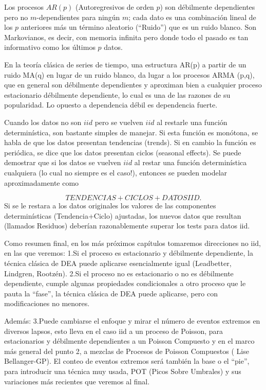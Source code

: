 \documentclass[
  12pt]{article}
\begin{document}
Los procesos \(AR(p)\) (Autoregresivos de orden \(p\)) son débilmente
dependientes pero no \(m\)-dependientes para ningún \(m\); cada dato es
una combinación lineal de los \(p\) anteriores más un término aleatorio
(``Ruido'') que es un ruido blanco. Son Markovianos, es decir, con
memoria infinita pero donde todo el pasado es tan informativo como los
últimos \(p\) datos.

En la teoría clásica de series de tiempo, una estructura AR(p) a partir
de un ruido MA(q) en lugar de un ruido blanco, da lugar a los procesos
ARMA (p,q), que en general son débilmente dependientes y aproximan bien
a cualquier proceso estacionario débilmente dependiente, lo cual es una
de las razones de su popularidad. Lo opuesto a dependencia débil es
dependencia fuerte.

Cuando los datos no son \(iid\) pero se vuelven \(iid\) al restarle una
función determinística, son bastante simples de manejar. Si esta función
es monótona, se habla de que los datos presentan tendencias (trends). Si
en cambio la función es periódica, se dice que los datos presentan
ciclos (seasonal effects). Se puede demostrar que si los datos se
vuelven \(iid\) al restar una función determinística cualquiera (lo cual
no siempre es el caso!), entonces se pueden modelar aproximadamente como

\[
TENDENCIAS+CICLOS+ DATOS IID.
\] Si se le restara a los datos originales los valores de las
componentes determinísticas (Tendencia+Ciclo) ajustadas, los nuevos
datos que resultan (llamados Residuos) deberían razonablemente superar
los tests para datos iid.

Como resumen final, en los más próximos capítulos tomaremos direcciones
no iid, en las que veremos: 1.Si el proceso es estacionario y débilmente
dependiente, la técnica clásica de DEA puede aplicarse esencialmente
igual (Leadbetter, Lindgren, Rootzén). 2.Si el proceso no es
estacionario o no es débilmente dependiente, cumple algunas propiedades
condicionales a otro proceso que le pauta la ``fase'', la técnica
clásica de DEA puede aplicarse, pero con modificaciones no menores.

Además: 3.Puede cambiarse el enfoque y mirar el número de eventos
extremos en diversos lapsos, esto lleva en el caso iid a un proceso de
Poisson, para estacionarios y débilmente dependientes a un Poisson
Compuesto y en el marco más general del punto 2, a mezclas de Procesos
de Poisson Compuestos ( Lise Bellanger-GP). El conteo de eventos
extremos será también la base o el ``pie'', para introducir una técnica
muy usada, POT (Picos Sobre Umbrales) y sus variaciones más recientes
que veremos al final.
\end{document}
